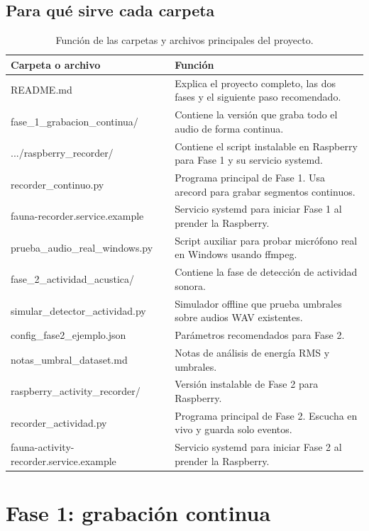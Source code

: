 \documentclass[11pt,letterpaper]{article}
\begin{document}
\subsection{Para qué sirve cada carpeta}

\begin{table}[H]
\centering
\small
\renewcommand{\arraystretch}{1.18}
\begin{tabularx}{\textwidth}{>{\raggedright\arraybackslash\ttfamily\footnotesize}p{} X}
\toprule
\textnormal{Carpeta o archivo} & Función \\
\midrule
README.md & Explica el proyecto completo, las dos fases y el siguiente paso recomendado. \\
fase\_1\_grabacion\_continua/ & Contiene la versión que graba todo el audio de forma continua. \\
.../raspberry\_recorder/ & Contiene el script instalable en Raspberry para Fase 1 y su servicio systemd. \\
recorder\_continuo.py & Programa principal de Fase 1. Usa arecord para grabar segmentos continuos. \\
fauna-recorder.service.example & Servicio systemd para iniciar Fase 1 al prender la Raspberry. \\
prueba\_audio\_real\_windows.py & Script auxiliar para probar micrófono real en Windows usando ffmpeg. \\
fase\_2\_actividad\_acustica/ & Contiene la fase de detección de actividad sonora. \\
simular\_detector\_actividad.py & Simulador offline que prueba umbrales sobre audios WAV existentes. \\
config\_fase2\_ejemplo.json & Parámetros recomendados para Fase 2. \\
notas\_umbral\_dataset.md & Notas de análisis de energía RMS y umbrales. \\
raspberry\_activity\_recorder/ & Versión instalable de Fase 2 para Raspberry. \\
recorder\_actividad.py & Programa principal de Fase 2. Escucha en vivo y guarda solo eventos. \\
fauna-activity-recorder.service.example & Servicio systemd para iniciar Fase 2 al prender la Raspberry. \\
\bottomrule
\end{tabularx}
\caption{Función de las carpetas y archivos principales del proyecto.}
\end{table}

\section{Fase 1: grabación continua}
\end{document}

